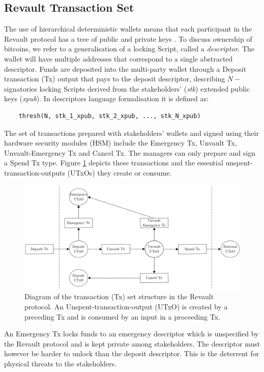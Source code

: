 \documentclass[runningheads]{llncs}
\begin{document}
\subsection{Revault Transaction Set}
\label{sec:TransactionSet}

The use of hierarchical deterministic wallets means that each participant in the Revault protocol has a tree of public and private keys \cite{BIP32}. To discuss ownership of bitcoins, we refer to a generalisation of a locking Script, called a \textit{descriptor}. The wallet will have multiple addresses that correspond to a single abstracted descriptor. Funds are deposited into the multi-party wallet through a Deposit transaction (Tx) output that pays to the deposit descriptor, describing $N-$signatories locking Scripts derived from the stakeholders' (\textit{stk}) extended public keys (\textit{xpub}). In descriptors language formalisation \cite{ScriptDescriptors} it is defined  as: \begin{verbatim}
    thresh(N, stk_1_xpub, stk_2_xpub, ..., stk_N_xpub)
\end{verbatim}

The set of transactions prepared with stakeholders' wallets and signed using their hardware security modules (HSM) include the Emergency Tx, Unvault Tx, Unvault-Emergency Tx and Cancel Tx. The managers can only prepare and sign a Spend Tx type. Figure \ref{fig:tx_diagram} depicts these transactions and the essential unspent-transaction-outputs (UTxOs) they create or consume.

\begin{figure}[t]
\centering
    \includegraphics[width=12cm]{tx_diagram.png}
    \caption{Diagram of the transaction (Tx) set structure in the Revault protocol. An Unspent-transaction-output (UTxO) is created by a preceding Tx and is consumed by an input in a proceeding Tx.}
    \label{fig:tx_diagram}
\end{figure}

An Emergency Tx locks funds to an emergency descriptor which is unspecified by the Revault protocol and is kept private among stakeholders. The descriptor must however be harder to unlock than the deposit descriptor. This is the deterrent for physical threats to the stakeholders. 
\end{document}
